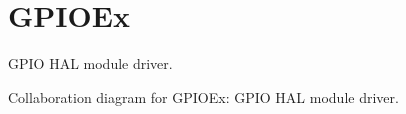 \hypertarget{group__GPIOEx}{}\section{G\+P\+I\+O\+Ex}
\label{group__GPIOEx}


G\+P\+IO H\+AL module driver.  


Collaboration diagram for G\+P\+I\+O\+Ex\+:
G\+P\+IO H\+AL module driver. 

